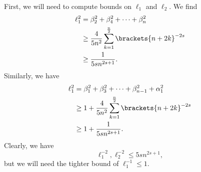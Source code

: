First, we will need to compute bounds on $\ell_{1}$ and $\ell_{2}$.
We find
%
\begin{align}
    \ell_{1}^{2} &= \beta_{2}^{2} + \beta_{4}^{2} + \cdots + \beta_{n}^{2}
        \nonumber\\
    &\ge \frac{4}{5n^{2}} \sum_{k=1}^{\frac{n}{2}} \brackets{n + 2k}^{-2s}
        \nonumber\\
    &\ge \frac{1}{5sn^{2s+1}}.
\end{align}
%
Similarly, we have
%
\begin{align}
    \ell_{1}^{2} &= \beta_{1}^{2} + \beta_{3}^{2} + \cdots + \beta_{n-1}^{2}
        + \alpha_{1}^{2}
        \nonumber\\
    &\ge 1 + \frac{4}{5n^{2}} \sum_{k=1}^{\frac{n}{2}} \brackets{n + 2k}^{-2s}
        \nonumber\\
    &\ge 1 + \frac{1}{5sn^{2s+1}}.
\end{align}
%
Clearly, we have
%
\begin{equation}
    \ell_{1}^{-2},\ell_{2}^{-2} \le 5sn^{2s+1},
\end{equation}
%
but we will need the tighter bound of $\ell_{1}^{-1}\le1$.

